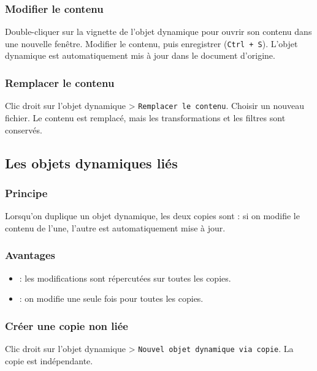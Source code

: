 \subsubsection{Modifier le contenu}

Double-cliquer sur la vignette de l'objet dynamique pour ouvrir son contenu dans une nouvelle fenêtre. Modifier le contenu, puis enregistrer (\texttt{Ctrl + S}). L'objet dynamique est automatiquement mis à jour dans le document d'origine.

\subsubsection{Remplacer le contenu}

Clic droit sur l'objet dynamique > \texttt{Remplacer le contenu}. Choisir un nouveau fichier. Le contenu est remplacé, mais les transformations et les filtres sont conservés.

\subsection{Les objets dynamiques liés}

\subsubsection{Principe}

Lorsqu'on duplique un objet dynamique, les deux copies sont  : si on modifie le contenu de l'une, l'autre est automatiquement mise à jour.

\subsubsection{Avantages}

\begin{itemize}
    \item {} : les modifications sont répercutées sur toutes les copies.
    \item {} : on modifie une seule fois pour toutes les copies.
\end{itemize}

\subsubsection{Créer une copie non liée}

Clic droit sur l'objet dynamique > \texttt{Nouvel objet dynamique via copie}. La copie est indépendante.

